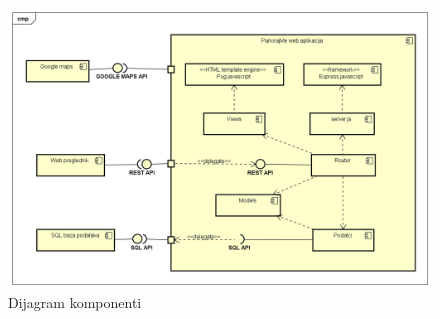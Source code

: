 			 \begin{figure}[H]
				 	\includegraphics[scale=0.55]{dijagrami/Component Diagram0.png} %
				 	\centering
				 	\caption{Dijagram komponenti}
				 	\label{fig:dijagram komponenti}
			 \end{figure}
			 
			 